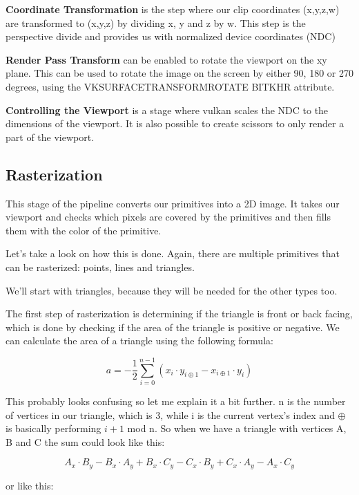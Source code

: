 \documentclass[12pt]{report} \usepackage{preamble}
\begin{document}
\textbf{Coordinate Transformation} is the step where our clip coordinates (x,y,z,w) are transformed to (x,y,z) by dividing x, y and z by w.
This step is the perspective divide and provides us with normalized device coordinates (NDC) \cite{vertex-post-processing}

\textbf{Render Pass Transform} can be enabled to rotate the viewport on the xy plane. This can be used to rotate the image on the screen
by either 90, 180 or 270 degrees, using the VK\textunderscore SURFACE\textunderscore TRANSFORM\textunderscore ROTATE\textunderscore
BIT\textunderscore KHR attribute. \cite{vertex-post-processing}

\textbf{Controlling the Viewport} is a stage where vulkan scales the NDC to the dimensions of the viewport. It is also possible to create
scissors to only render a part of the viewport.

\subsection{Rasterization}

This stage of the pipeline converts our primitives into a 2D image. It takes our viewport and checks which pixels are covered by the
primitives and then fills them with the color of the primitive.

Let's take a look on how this is done. Again, there are multiple primitives that can be rasterized: points, lines and triangles.

We'll start with triangles, because they will be needed for the other types too.

The first step of rasterization is determining if the triangle is front or back facing, which is done by checking if the area of the triangle
is positive or negative. We can calculate the area of a triangle using the following formula:

\[
	a = -\frac{1}{2} \sum_{i=0}^{n-1} (x_i \cdot y_{i\oplus 1} - x_{i\oplus 1} \cdot y_i)
\]

This probably looks confusing so let me explain it a bit further. n is the number of vertices in our triangle, which is 3, while i is the current
vertex's index and \(\oplus\) is basically performing \( i+1\) mod n. So when we have a triangle with vertices A, B and C the sum could look like this:

\[A_x \cdot B_y - B_x \cdot A_y + B_x \cdot C_y - C_x \cdot B_y + C_x \cdot A_y - A_x \cdot C_y\]

or like this:
\end{document}
